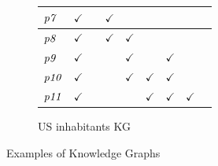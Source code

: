 \begin{figure}[t]
\begin{subfigure}[b]{0.24\textwidth}
\begin{tabular}{|l|l|l|l|l|l|l|l|l|}
$\mathit{p7}$ & $\checkmark$ & &$\checkmark$&&&& \\ \hline
$\mathit{p8}$ & $\checkmark$ & &$\checkmark$&$\checkmark$&&& \\ \hline
$\mathit{p9}$ & $\checkmark$ & &&$\checkmark$&&$\checkmark$& \\ \hline
$\mathit{p10}$ & $\checkmark$ & &&$\checkmark$&$\checkmark$&$\checkmark$& \\ \hline
$\mathit{p11}$ & $\checkmark$ & &&&$\checkmark$&$\checkmark$&$\checkmark$ \\ \hline
\end{tabular}
\smallskip
\caption{US inhabitants KG}
\label{tab:im}
\end{subfigure}
\caption{Examples of Knowledge Graphs}
\end{figure}


